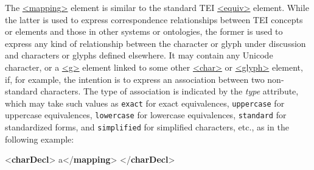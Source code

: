 The \hyperref[TEI.mapping]{<mapping>} element is similar to the standard TEI \hyperref[TEI.equiv]{<equiv>} element. While the latter is used to express correspondence relationships between TEI concepts or elements and those in other systems or ontologies, the former is used to express any kind of relationship between the character or glyph under discussion and characters or glyphs defined elsewhere. It may contain any Unicode character, or a \hyperref[TEI.g]{<g>} element linked to some other \hyperref[TEI.char]{<char>} or \hyperref[TEI.glyph]{<glyph>} element, if, for example, the intention is to express an association between two non-standard characters. The type of association is indicated by the {\itshape type} attribute, which may take such values as \texttt{exact} for exact equivalences, \texttt{uppercase} for uppercase equivalences, \texttt{lowercase} for lowercase equivalences, \texttt{standard} for standardized forms, and \texttt{simplified} for simplified characters, etc., as in the following example: \par\bgroup{}\exampleFont \begin{shaded}\noindent\mbox{}{<\textbf{charDecl}>}\mbox{}\newline 
{}\mbox{}\newline 
\hspace*{1em}\mbox{}\newline 
\hspace*{1em}\mbox{}\newline 
\hspace*{1em}a{</\textbf{mapping}>}\mbox{}\newline 
{}\mbox{}\newline 
{</\textbf{charDecl}>}\end{shaded}\egroup\par \par
